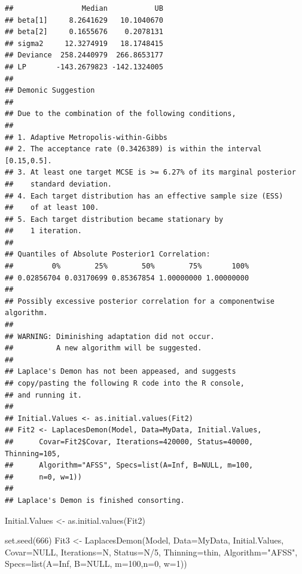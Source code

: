 \documentclass[
]{book}
\newenvironment{Shaded}{\begin{snugshade}}{\end{snugshade}}
\newcommand{\AttributeTok}[1]{\textcolor[rgb]{0.77,0.63,0.00}{#1}}
\newcommand{\ConstantTok}[1]{\textcolor[rgb]{0.00,0.00,0.00}{#1}}
\newcommand{\DecValTok}[1]{\textcolor[rgb]{0.00,0.00,0.81}{#1}}
\newcommand{\FunctionTok}[1]{\textcolor[rgb]{0.00,0.00,0.00}{#1}}
\newcommand{\NormalTok}[1]{#1}
\newcommand{\OtherTok}[1]{\textcolor[rgb]{0.56,0.35,0.01}{#1}}
\newcommand{\SpecialCharTok}[1]{\textcolor[rgb]{0.00,0.00,0.00}{#1}}
\newcommand{\StringTok}[1]{\textcolor[rgb]{0.31,0.60,0.02}{#1}}
\begin{document}
\begin{verbatim}
##                Median           UB
## beta[1]     8.2641629   10.1040670
## beta[2]     0.1655676    0.2078131
## sigma2     12.3274919   18.1748415
## Deviance  258.2440979  266.8653177
## LP       -143.2679823 -142.1324005
## 
## Demonic Suggestion
## 
## Due to the combination of the following conditions,
## 
## 1. Adaptive Metropolis-within-Gibbs
## 2. The acceptance rate (0.3426389) is within the interval [0.15,0.5].
## 3. At least one target MCSE is >= 6.27% of its marginal posterior
##    standard deviation.
## 4. Each target distribution has an effective sample size (ESS)
##    of at least 100.
## 5. Each target distribution became stationary by
##    1 iteration.
## 
## Quantiles of Absolute Posterior1 Correlation:
##         0%        25%        50%        75%       100% 
## 0.02856704 0.03170699 0.85367854 1.00000000 1.00000000 
## 
## Possibly excessive posterior correlation for a componentwise algorithm.
## 
## WARNING: Diminishing adaptation did not occur.
##          A new algorithm will be suggested.
## 
## Laplace's Demon has not been appeased, and suggests
## copy/pasting the following R code into the R console,
## and running it.
## 
## Initial.Values <- as.initial.values(Fit2)
## Fit2 <- LaplacesDemon(Model, Data=MyData, Initial.Values,
##      Covar=Fit2$Covar, Iterations=420000, Status=40000, Thinning=105,
##      Algorithm="AFSS", Specs=list(A=Inf, B=NULL, m=100,
##      n=0, w=1))
## 
## Laplace's Demon is finished consorting.
\end{verbatim}

\begin{Shaded}
\begin{Highlighting}[]
\NormalTok{Initial.Values }\OtherTok{\textless{}{-}} \FunctionTok{as.initial.values}\NormalTok{(Fit2)}

\FunctionTok{set.seed}\NormalTok{(}\DecValTok{666}\NormalTok{)}
\NormalTok{Fit3 }\OtherTok{\textless{}{-}} \FunctionTok{LaplacesDemon}\NormalTok{(Model, }\AttributeTok{Data=}\NormalTok{MyData, Initial.Values,}
     \AttributeTok{Covar=}\ConstantTok{NULL}\NormalTok{, }\AttributeTok{Iterations=}\NormalTok{N, }\AttributeTok{Status=}\NormalTok{N}\SpecialCharTok{/}\DecValTok{5}\NormalTok{, }\AttributeTok{Thinning=}\NormalTok{thin,}
     \AttributeTok{Algorithm=}\StringTok{"AFSS"}\NormalTok{, }\AttributeTok{Specs=}\FunctionTok{list}\NormalTok{(}\AttributeTok{A=}\ConstantTok{Inf}\NormalTok{, }\AttributeTok{B=}\ConstantTok{NULL}\NormalTok{, }\AttributeTok{m=}\DecValTok{100}\NormalTok{,}\AttributeTok{n=}\DecValTok{0}\NormalTok{, }\AttributeTok{w=}\DecValTok{1}\NormalTok{))}
\end{Highlighting}
\end{Shaded}
\end{document}
